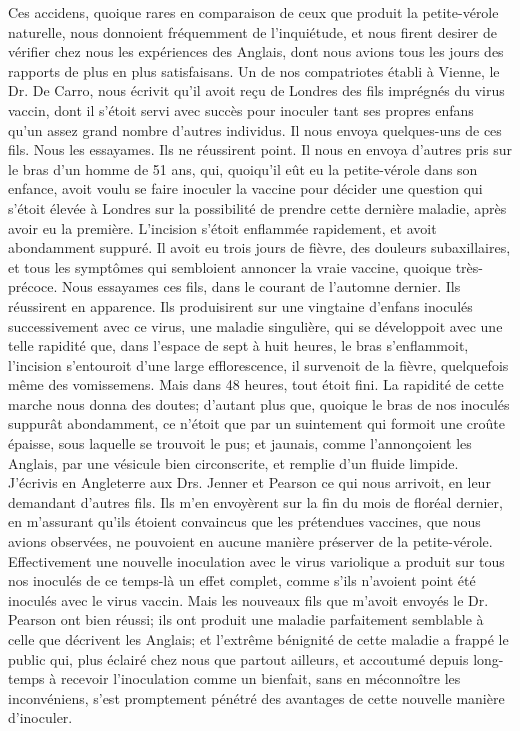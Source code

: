 Ces accidens, quoique rares en comparaison de ceux que produit la petite-vérole naturelle, nous donnoient fréquemment de l'inquiétude, et nous firent desirer de vérifier chez nous les expériences des Anglais, dont nous avions tous les jours des rapports de plus en plus satisfaisans. Un de nos compatriotes établi à Vienne, le Dr. De Carro, nous écrivit qu'il avoit reçu de Londres des fils imprégnés du virus vaccin, dont il s'étoit servi avec succès pour inoculer tant ses propres\setcounter{page}{75} enfans qu’un assez grand nombre d’autres individus. Il nous envoya quelques-uns de ces fils. Nous les essayames. Ils ne réussirent point. Il nous en envoya d’autres pris sur le bras d’un homme de 51 ans, qui, quoiqu’il eût eu la petite-vérole dans son enfance, avoit voulu se faire inoculer la vaccine pour décider une question qui s’étoit élevée à Londres sur la possibilité de prendre cette dernière maladie, après avoir eu la première. L’incision s’étoit enflammée rapidement, et avoit abondamment suppuré. Il avoit eu trois jours de fièvre, des douleurs subaxillaires, et tous les symptômes qui sembloient annoncer la vraie vaccine, quoique très-précoce. Nous essayames ces fils, dans le courant de l’automne dernier. Ils réussirent en apparence. Ils produisirent sur une vingtaine d’enfans inoculés successivement avec ce virus, une maladie singulière, qui se développoit avec une telle rapidité que, dans l’espace de sept à huit heures, le bras s’enflammoit, l’incision s’entouroit d’une large efflorescence, il survenoit de la fièvre, quelquefois même des vomissemens. Mais dans 48 heures, tout étoit fini. La rapidité de cette marche nous donna des doutes; d’autant plus que, quoique le bras de nos inoculés suppurât abondamment, ce n’étoit que par un suintement qui formoit une croûte\setcounter{page}{76} épaisse, sous laquelle se trouvoit le pus; et jaunais, comme l'annonçoient les Anglais, par une vésicule bien circonscrite, et remplie d'un fluide limpide. J'écrivis en Angleterre aux Drs. Jenner et Pearson ce qui nous arrivoit, en leur demandant d'autres fils. Ils m'en envoyèrent sur la fin du mois de floréal dernier, en m'assurant qu'ils étoient convaincus que les prétendues vaccines, que nous avions observées, ne pouvoient en aucune manière préserver de la petite-vérole.
Effectivement une nouvelle inoculation avec le virus variolique a produit sur tous nos inoculés de ce temps-là un effet complet, comme s'ils n'avoient point été inoculés avec le virus vaccin.
Mais les nouveaux fils que m'avoit envoyés le Dr. Pearson ont bien réussi; ils ont produit une maladie parfaitement semblable à celle que décrivent les Anglais; et l'extrême bénignité de cette maladie a frappé le public qui, plus éclairé chez nous que partout ailleurs, et accoutumé depuis long-temps à recevoir l'inoculation comme un bienfait, sans en méconnoître les inconvéniens, s'est promptement pénétré des avantages de cette nouvelle manière d'inoculer.
